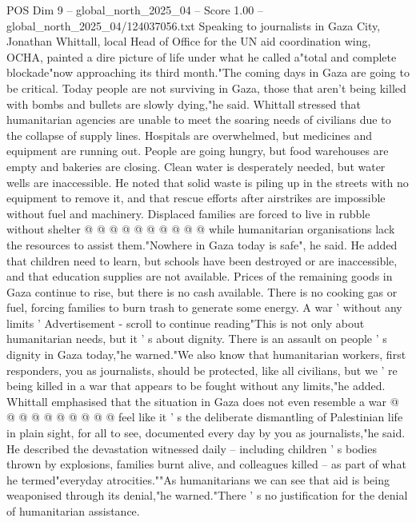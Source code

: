 \begin{textsample}{POS Dim 9 – global\_north\_2025\_04 – Score 1.00 – global\_north\_2025\_04/124037056.txt}  \label{ex:f9_pos_425}
Speaking to journalists in Gaza City, Jonathan Whittall, local Head of Office for the UN aid coordination wing, OCHA, painted a dire picture of life under what he called a"total and complete blockade"now approaching its third month."The coming days in Gaza are going to be critical.
Today people are not surviving in Gaza, those that aren't being killed with bombs and bullets are slowly dying,"he said.
Whittall stressed that humanitarian agencies are unable to meet the soaring needs of civilians due to the collapse of supply lines.
Hospitals are overwhelmed, but medicines and equipment are running out.
People are going hungry, but food warehouses are empty and bakeries are closing.
Clean water is desperately needed, but water wells are inaccessible.
He noted that solid waste is piling up in the streets with no equipment to remove it, and that rescue efforts after airstrikes are impossible without fuel and machinery.
Displaced families are forced to live in rubble without shelter @ @ @ @ @ @ @ @ @ @ while humanitarian organisations lack the resources to assist them."Nowhere in Gaza today is safe", he said.
He added that children need to learn, but schools have been destroyed or are inaccessible, and that education supplies are not available.
Prices of the remaining goods in Gaza continue to rise, but there is no cash available.
There is no cooking gas or fuel, forcing families to burn trash to generate some energy.
A war ' without any limits ' Advertisement - scroll to continue reading"This is not only about humanitarian needs, but it ' s about dignity.
There is an assault on people ' s dignity in Gaza today,"he warned."We also know that humanitarian workers, first responders, you as journalists, should be protected, like all civilians, but we ' re being killed in a war that appears to be fought without any limits,"he added.
Whittall emphasised that the situation in Gaza does not even resemble a war @ @ @ @ @ @ @ @ @ @ feel like it ' s the deliberate dismantling of Palestinian life in plain sight, for all to see, documented every day by you as journalists,"he said.
He described the devastation witnessed daily -- including children ' s bodies thrown by explosions, families burnt alive, and colleagues killed -- as part of what he termed"everyday atrocities.""As humanitarians we can see that aid is being weaponised through its denial,"he warned."There ' s no justification for the denial of humanitarian assistance.

\end{textsample}
